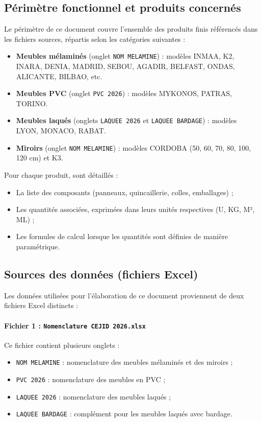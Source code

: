 \documentclass[12pt,a4paper]{article}
\begin{document}
\subsection{Périmètre fonctionnel et produits concernés}
Le périmètre de ce document couvre l'ensemble des produits finis référencés dans les fichiers sources, répartis selon les catégories suivantes :

\begin{itemize}
    \item \textbf{Meubles mélaminés} (onglet \texttt{NOM MELAMINE}) : modèles INMAA, K2, INARA, DENIA, MADRID, SEBOU, AGADIR, BELFAST, ONDAS, ALICANTE, BILBAO, etc.
    \item \textbf{Meubles PVC} (onglet \texttt{PVC 2026}) : modèles MYKONOS, PATRAS, TORINO.
    \item \textbf{Meubles laqués} (onglets \texttt{LAQUEE 2026} et \texttt{LAQUEE BARDAGE}) : modèles LYON, MONACO, RABAT.
    \item \textbf{Miroirs} (onglet \texttt{NOM MELAMINE}) : modèles CORDOBA (50, 60, 70, 80, 100, 120 cm) et K3.
\end{itemize}

Pour chaque produit, sont détaillés :
\begin{itemize}
    \item La liste des composants (panneaux, quincaillerie, colles, emballages) ;
    \item Les quantités associées, exprimées dans leurs unités respectives (U, KG, M², ML) ;
    \item Les formules de calcul lorsque les quantités sont définies de manière paramétrique.
\end{itemize}

\subsection{Sources des données (fichiers Excel)}
Les données utilisées pour l'élaboration de ce document proviennent de deux fichiers Excel distincts :

\paragraph{Fichier 1 : \texttt{Nomenclature CEJID 2026.xlsx}}
Ce fichier contient plusieurs onglets :
\begin{itemize}
    \item \texttt{NOM MELAMINE} : nomenclature des meubles mélaminés et des miroirs ;
    \item \texttt{PVC 2026} : nomenclature des meubles en PVC ;
    \item \texttt{LAQUEE 2026} : nomenclature des meubles laqués ;
    \item \texttt{LAQUEE BARDAGE} : complément pour les meubles laqués avec bardage.
\end{itemize}
\end{document}
